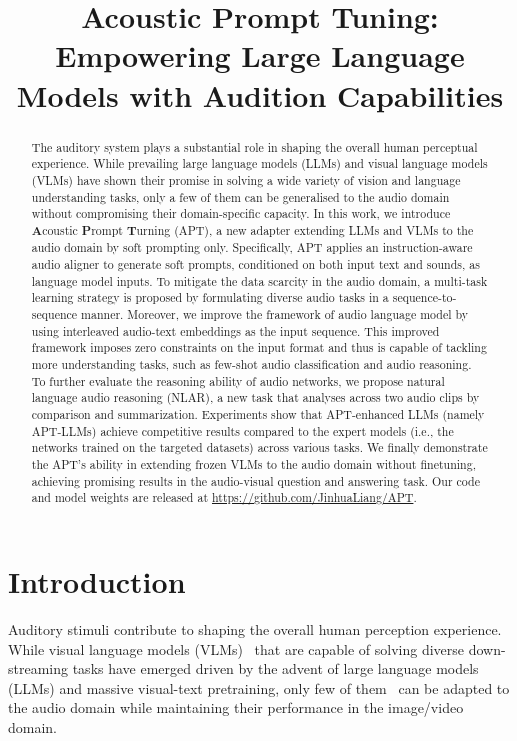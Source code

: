 \title{Acoustic Prompt Tuning: Empowering Large Language Models with Audition Capabilities}



\maketitle

\begin{abstract}
The auditory system plays a substantial role in shaping the overall human perceptual experience. While prevailing large language models (LLMs) and visual language models (VLMs) have shown their promise in solving a wide variety of vision and language understanding tasks, only a few of them can be generalised to the audio domain without compromising their domain-specific capacity. In this work, we introduce \textbf{A}coustic \textbf{P}rompt \textbf{T}urning (APT), a new adapter extending LLMs and VLMs to the audio domain by soft prompting only. Specifically, APT applies an instruction-aware audio aligner to generate soft prompts, conditioned on both input text and sounds, as language model inputs. To mitigate the data scarcity in the audio domain, a multi-task learning strategy is proposed by formulating diverse audio tasks in a sequence-to-sequence manner. Moreover, we improve the framework of audio language model by using interleaved audio-text embeddings as the input sequence. This improved framework imposes zero constraints on the input format and thus is capable of tackling more understanding tasks, such as few-shot audio classification and audio reasoning. To further evaluate the reasoning ability of audio networks, we propose natural language audio reasoning (NLAR), a new task that analyses across two audio clips by comparison and summarization. Experiments show that APT-enhanced LLMs (namely APT-LLMs) achieve competitive results compared to the expert models (i.e., the networks trained on the targeted datasets) across various tasks. We finally demonstrate the APT's ability in extending frozen VLMs to the audio domain without finetuning, achieving promising results in the audio-visual question and answering task. Our code and model weights are released at \url{https://github.com/JinhuaLiang/APT}.\let\thefootnote\relax{}
\end{abstract}

\section{Introduction} \label{sec:introduction}
Auditory stimuli contribute to shaping the overall human perception experience. While visual language models (VLMs)~\citep{li_blip-2_2023,liu_visual_2023,dai_instructblip_2023,shukor_unified_2023,han_imagebind-llm_2023} that are capable of solving diverse down-streaming tasks have emerged driven by the advent of large language models (LLMs) and massive visual-text pretraining, only few of them~\citep{shukor_unified_2023,han_imagebind-llm_2023} can be adapted to the audio domain while maintaining their performance in the image/video domain.

